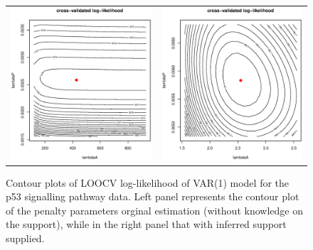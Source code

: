 \documentclass[a4paper]{article}
\begin{document}
\begin{figure}[h!]
\centering
\begin{tabular}{cc}
\includegraphics[scale=0.3]{contourPlot_nonSparse.eps}
&
\includegraphics[scale=0.3]{contourPlot_sparse.eps}
\end{tabular}
\caption{Contour plots of LOOCV log-likelihood of VAR(1) model for the p53 signalling pathway data. Left panel represents the contour plot of the penalty parameters orginal estimation (without knowledge on the support), while in the right panel that with inferred support supplied.}
\label{figSM:contour}
\end{figure}
\end{document}

